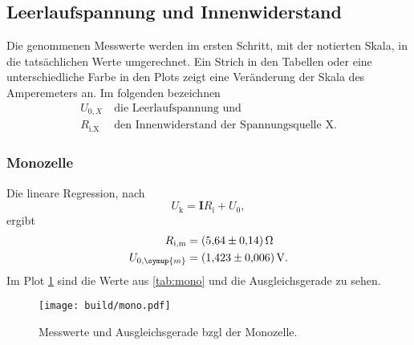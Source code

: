 \subsection{Leerlaufspannung und Innenwiderstand}
\label{sec:LeerRi}
Die genommenen Messwerte werden im ersten Schritt, mit der notierten Skala,
in die tatsächlichen Werte umgerechnet. Ein Strich in den Tabellen oder eine
unterschiedliche Farbe in den Plots zeigt eine Veränderung der Skala des Amperemeters an.
Im folgenden bezeichnen
\begin{align*}
  U_{0,X} \: &\text{die Leerlaufspannung und} \\
      R_\text{i,X} \: &\text{den Innenwiderstand der Spannungsquelle X.}
\end{align*}

\subsubsection{Monozelle}
\label{sec:monozelle}
Die lineare Regression, nach
\begin{equation*}
      U_\text{k} = \symbf{I} R_\text{i} + U_0,
\end{equation*}
ergibt
\begin{align}
      R_\text{i,m} &= \SI{5.64(14)}{\ohm}
      \label{eqn:rimono} \\
      U_{0,\symup{m}} &= \SI{1.423(006)}{\volt}.
      \label{eqn:u0mono}
\end{align}
Im Plot \ref{fig:mono} sind die Werte aus \ref{tab:mono} und die Ausgleichsgerade zu sehen.
\begin{figure}
      \centering
      \texttt{[image: build/mono.pdf]}
      \caption{Messwerte und Ausgleichsgerade bzgl der Monozelle.}
      \label{fig:mono}
\end{figure}
